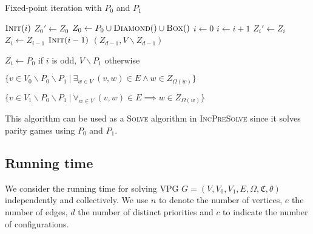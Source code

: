 \begin{algorithm}[h]
	\caption{Fixed-point iteration with $P_0$ and $P_1$}
	\label{alg_FPITE}
	\begin{multicols}{2}
		\begin{algorithmic}[1]
					\State $\textsc{Init}(i)$
				\EndFor
				\Repeat
					\State $Z_0'\gets Z_0$
					\State $Z_0 \gets P_0 \cup \textsc{Diamond}() \cup \textsc{Box}()$
					\State $i \gets 0$
						\State $i \gets i+1$
						\State $Z_i' \gets Z_i$
						\State $Z_i \gets Z_{i-1}$
						\State $\textsc{Init}(i-1)$
					\EndWhile
				\State \Return $(Z_{d-1},V\backslash Z_{d-1})$
			\EndFunction
		\end{algorithmic}\bigskip\bigskip\bigskip
		\begin{algorithmic}[1]
			\Function{Init}{$i$}
				\State $Z_i \gets P_0$ if $i$ is odd, $V\backslash P_1$ otherwise
			\EndFunction
		\end{algorithmic}\bigskip
		\begin{algorithmic}[1]
			\Function{Diamond}{}
				\State \Return $\{ v \in V_0 \backslash P_0 \backslash P_1 \ |\ \exists_{w\in V}\ (v,w) \in E \wedge w \in Z_{\Omega(w)}\}$
			\EndFunction
		\end{algorithmic}\bigskip
		\begin{algorithmic}[1]
			\Function{Box}{}
			\State \Return $\{ v \in V_1\backslash P_0 \backslash P_1\ |\ \forall_{w\in V}\ (v,w) \in E \implies w \in Z_{\Omega(w)}\}$
			\EndFunction
		\end{algorithmic}
	\end{multicols}
\end{algorithm}

This algorithm can be used as a \textsc{Solve} algorithm in \textsc{IncPreSolve} since it solves parity games using $P_0$ and $P_1$.

\subsection{Running time}
We consider the running time for solving VPG $G = (V,V_0,V_1,E,\Omega,\mathfrak{C},\theta)$ independently and collectively. We use $n$ to denote the number of vertices, $e$ the number of edges, $d$ the number of distinct priorities and $c$ to indicate the number of configurations.

